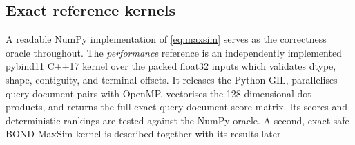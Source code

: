 \subsection{Exact reference kernels}

A readable NumPy implementation of \cref{eq:maxsim} serves as the correctness
oracle throughout. The \emph{performance} reference is an independently 
implemented pybind11 C++17 kernel over the packed float32 inputs which validates 
dtype, shape, contiguity, and terminal offsets. It releases the Python GIL, 
parallelises query-document pairs with OpenMP, vectorises the 128-dimensional 
dot products, and returns the full exact query-document score matrix. Its scores 
and deterministic rankings are tested against the NumPy oracle. A second, 
exact-safe BOND-MaxSim kernel is described together with its results later.
